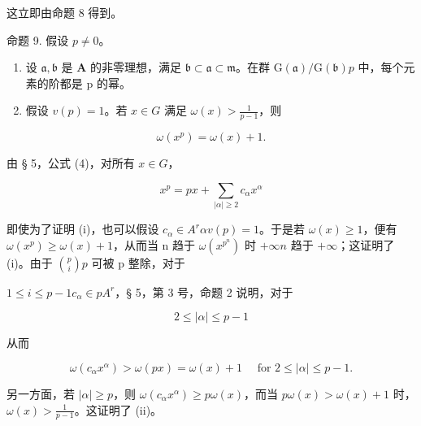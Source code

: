 这立即由命题 8 得到。

命题 9. 假设 \(p \neq 0\)。

\begin{enumerate}
\def\labelenumi{(\roman{enumi})}
\item
  设 \(\mathfrak{a},\mathfrak{b}\) 是 \(\mathbf{A}\) 的非零理想，满足 \(\mathfrak{b} \subset \mathfrak{a} \subset \mathfrak{m}\)。在群 \(\mathrm{G}(\mathfrak{a}) / \mathrm{G}(\mathfrak{b})\)\(p\) 中，每个元素的阶都是 p 的幂。
\item
  假设 \(v(p) = 1\)。若 \(x \in G\) 满足 \(\omega(x) > \frac{1}{p - 1}\)，则
\end{enumerate}

\[
\omega (x ^ {p}) = \omega (x) + 1.
\]

由 § 5，公式 (4)，对所有 \(x \in G\)，

\[
x ^ {p} = p x + \sum_ {| \alpha | \geqslant 2} c _ {\alpha} x ^ {\alpha}
\]

即使为了证明 (i)，也可以假设 \(c_{\alpha} \in A^{r}\)\(\alpha\)\(v(p) = 1\)。于是若 \(\omega(x) \geqslant 1\)，便有 \(\omega(x^{p}) \geqslant \omega(x) + 1\)，从而当 n 趋于 \(\omega(x^{p^{n}})\) 时 \(+\infty\)\(n\) 趋于 \(+\infty\)；这证明了 (i)。由于 \(\binom{p}{i}\)\(p\) 可被 p 整除，对于

\(1 \leqslant i \leqslant p - 1\)\(c_{\alpha} \in pA^{r}\)，§ 5，第 3 号，命题 2 说明，对于

\[
2 \leqslant | \alpha | \leqslant p - 1
\]

从而

\[
\omega \left(c _ {\alpha} x ^ {\alpha}\right) > \omega (p x) = \omega (x) + 1 \quad \text { for } 2 \leqslant | \alpha | \leqslant p - 1.
\]

另一方面，若 \(|\alpha| \geqslant p\)，则 \(\omega(c_{\alpha}x^{\alpha}) \geqslant p\omega(x)\)，而当 \(p\omega(x) > \omega(x) + 1\) 时，\(\omega(x) > \frac{1}{p - 1}\)。这证明了 (ii)。

